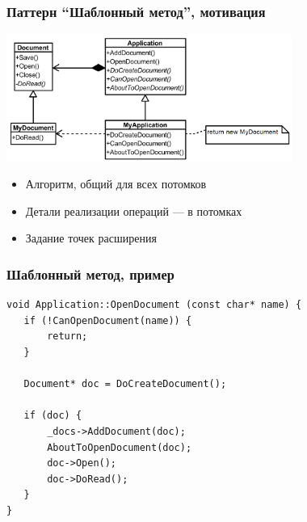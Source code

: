 \documentclass[xetex,mathserif,serif]{beamer}
\begin{document}
	\begin{frame}
		\frametitle{Паттерн ``Шаблонный метод'', мотивация}
		\begin{center}
			\includegraphics[width=0.7\textwidth]{templateMethodMotivation.png}
		\end{center}
		\begin{itemize}
			\item Алгоритм, общий для всех потомков
			\item Детали реализации операций --- в потомках
			\item Задание точек расширения
		\end{itemize}
	\end{frame}

	\begin{frame}[fragile]
		\frametitle{Шаблонный метод, пример}
		\begin{verbatim}
void Application::OpenDocument (const char* name) {
   if (!CanOpenDocument(name)) {
       return;
   }

   Document* doc = DoCreateDocument();
  
   if (doc) {
       _docs->AddDocument(doc);
       AboutToOpenDocument(doc);
       doc->Open();
       doc->DoRead();
   }
}
		\end{verbatim}
	\end{frame}
\end{document}
